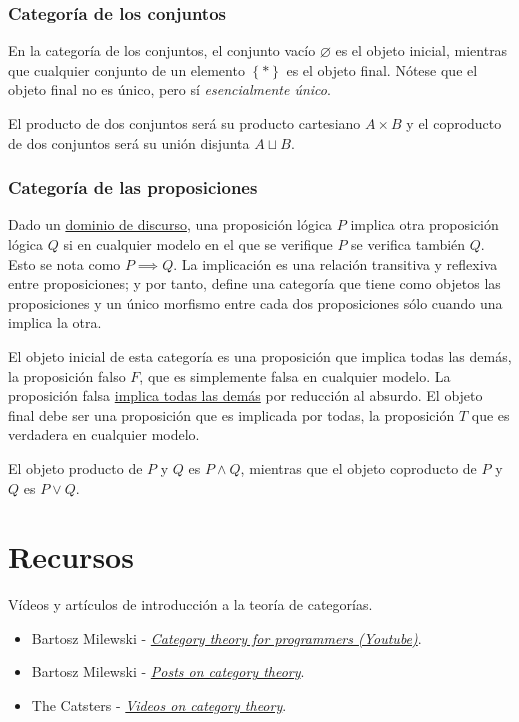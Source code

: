 \documentclass[11pt]{article}
\theoremstyle{plain}
\theoremstyle{definition}
\theoremstyle{remark}
\begin{document}
\subsubsection{Categoría de los conjuntos}
\label{sec:org4f655ed}
En la categoría de los conjuntos, el conjunto vacío \(\varnothing\) es el objeto
inicial, mientras que cualquier conjunto de un elemento \(\left\{ \ast \right\}\) es el
objeto final. Nótese que el objeto final no es único, pero sí
\emph{esencialmente único}.

El producto de dos conjuntos será su producto cartesiano \(A \times B\) y
el coproducto de dos conjuntos será su unión disjunta \(A \sqcup B\).

\subsubsection{Categoría de las proposiciones}
\label{sec:org6058dd8}
Dado un \href{https://es.wikipedia.org/wiki/Dominio\_de\_discurso}{dominio de discurso}, una proposición lógica \(P\) implica otra
proposición lógica \(Q\) si en cualquier modelo en el que se verifique
\(P\) se verifica también \(Q\). Esto se nota como \(P \implies Q\). La
implicación es una relación transitiva y reflexiva
entre proposiciones; y por tanto, define una categoría que tiene como
objetos las proposiciones y un único morfismo entre cada dos
proposiciones sólo cuando una implica la otra.

El objeto inicial de esta categoría es una proposición que implica
todas las demás, la proposición falso \(F\), que es simplemente falsa
en cualquier modelo. La proposición falsa
\href{https://es.wikipedia.org/wiki/Principio\_de\_explosi\%25C3\%25B3n}{implica todas las demás} por reducción al absurdo. El objeto final
debe ser una proposición que es implicada por todas, la proposición
\(T\) que es verdadera en cualquier modelo.

El objeto producto de \(P\) y \(Q\) es \(P \wedge Q\), mientras que el objeto
coproducto de \(P\) y \(Q\) es \(P \vee Q\).

\section{Recursos}
\label{sec:org6abf146}
Vídeos y artículos de introducción a la teoría de categorías.

\begin{itemize}
\item Bartosz Milewski - \emph{\href{https://www.youtube.com/watch?v=I8LbkfSSR58\&list=PLbgaMIhjbmEnaH\_LTkxLI7FMa2HsnawM\_\&index=1}{Category theory for programmers (Youtube)}}.
\item Bartosz Milewski - \emph{\href{https://bartoszmilewski.com/category/category-theory/}{Posts on category theory}}.
\item The Catsters - \emph{\href{https://www.youtube.com/user/TheCatsters}{Videos on category theory}}.
\end{itemize}
\end{document}
